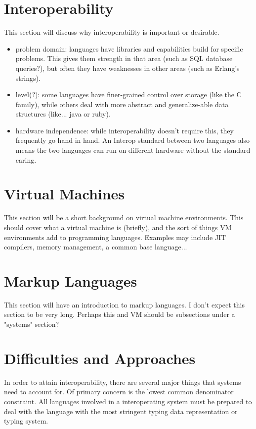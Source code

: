 \documentclass{sig-alternate}
\begin{document}
\section{Interoperability}\label{Interop}
This section will discuss why interoperability is important or desirable.
\begin{itemize}
	\item problem domain: languages have libraries and capabilities build for specific problems. This gives them strength in that area (such as SQL database queries?), but often they have weaknesses in other areas (such as Erlang's strings).
	\item level(?): some languages have finer-grained control over storage (like the C family), while others deal with more abstract and generalize-able data structures (like... java or ruby).
	\item hardware independence: while interoperability doesn't require this, they frequently go hand in hand. An Interop standard between two languages also means the two languages can run on different hardware without the standard caring.
\end{itemize}


\section{Virtual Machines}\label{VM}
This section will be a short background on virtual machine environments. This should cover what a virtual machine is (briefly), and the sort of things VM environments add to programming languages. Examples may include JIT compilers, memory management, a common base language...

\section{Markup Languages}\label{ML}
This section will have an introduction to markup languages. I don't expect this section to be very long. Perhaps this and VM should be subsections under a "systems" section?

\section{Difficulties and Approaches}\label{approaches}
In order to attain interoperability, there are several major things that systems need to account for. Of primary concern is the lowest common denominator constraint. All languages involved in a interoperating system must be prepared to deal with the language with the most stringent typing data representation or typing system. 
\end{document}
